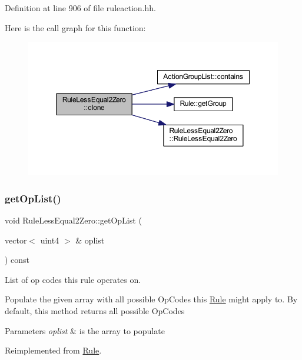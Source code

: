 Definition at line 906 of file ruleaction.\+hh.

Here is the call graph for this function\+:
\nopagebreak
\begin{figure}[H]
\begin{center}
\leavevmode
\includegraphics[width=350pt]{class_rule_less_equal2_zero_a52fe85f6b4dd887377b455bfca8612c3_cgraph}
\end{center}
\end{figure}
\mbox{\label{class_rule_less_equal2_zero_aba0936aa13755f400df52f33624aa98a}} 
\subsubsection{\texorpdfstring{getOpList()}{getOpList()}}
{\footnotesize\ttfamily void Rule\+Less\+Equal2\+Zero\+::get\+Op\+List (\begin{DoxyParamCaption}\item[{vector$<$ uint4 $>$ \&}]{oplist }\end{DoxyParamCaption}) const\hspace{0.3cm}{\ttfamily [virtual]}}



List of op codes this rule operates on. 

Populate the given array with all possible Op\+Codes this \mbox{\hyperlink{class_rule}{Rule}} might apply to. By default, this method returns all possible Op\+Codes 
\begin{DoxyParams}{Parameters}
{\em oplist} & is the array to populate \\
\hline
\end{DoxyParams}


Reimplemented from \mbox{\hyperlink{class_rule_a4023bfc7825de0ab866790551856d10e}{Rule}}.




